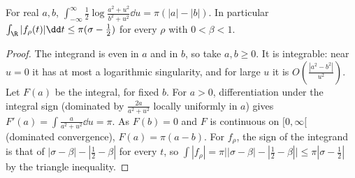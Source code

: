 \begin{lemma}\label{lem:logint}
For real $a,b$, $\displaystyle\int_{-\infty}^\infty\frac12\log\frac{a^2+u^2}{b^2+u^2}\dd u=\pi(|a|-|b|)$. In particular $\int_\R|f_\rho(t)|\dd t\le\pi(\sigma-\frac12)$ for every $\rho$ with $0<\beta<1$.
\end{lemma}
\begin{proof}
The integrand is even in $a$ and in $b$, so take $a,b\ge0$. It is integrable: near $u=0$ it has at most a logarithmic singularity, and for large $u$ it is $O(\frac{|a^2-b^2|}{u^2})$. Let $F(a)$ be the integral, for fixed $b$. For $a>0$, differentiation under the integral sign (dominated by $\frac{2a}{a^2+u^2}$ locally uniformly in $a$) gives $F'(a)=\int\frac a{a^2+u^2}\dd u=\pi$. As $F(b)=0$ and $F$ is continuous on $[0,\infty[$ (dominated convergence), $F(a)=\pi(a-b)$. For $f_\rho$, the sign of the integrand is that of $|\sigma-\beta|-|\frac12-\beta|$ for every $t$, so $\int|f_\rho|=\pi\bigl||\sigma-\beta|-|\frac12-\beta|\bigr|\le\pi|\sigma-\frac12|$ by the triangle inequality.
\end{proof}

